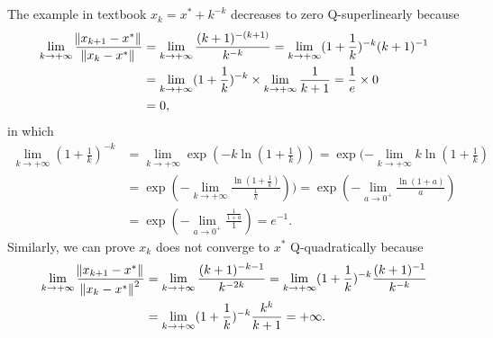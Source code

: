 \documentclass[11pt]{article}
\begin{document}
\maketitle
\section{}
The example in textbook $x_k=x^*+k^{-k}$ decreases to zero Q-superlinearly because \begin{equation}\begin{split}\lim_{k\to+\infty}\frac{\norm{x_{k+1}-x^*}}{\norm{x_{k}-x^*}}&=\lim_{k\to+\infty}\frac{(k+1)^{-(k+1)}}{k^{-k}}=\lim_{k\to+\infty}(1+\frac1k)^{-k}(k+1)^{-1}\\&=\lim_{k\to+\infty}(1+\frac1k)^{-k}\times\lim_{k\to+\infty}\frac1{k+1}=\frac1e\times0\\&=0,\end{split}\nonumber\end{equation} 
in which \begin{equation} \begin{split}\lim_{k\to+\infty} (1+\frac1k)^{-k} &= \lim_{k\to+\infty}\exp(-k\ln(1+\frac1k)) = \exp(-\lim_{k\to+\infty}k\ln(1+\frac1k)\\&=\exp(-\lim_{k\to+\infty} \frac{\ln(1+\frac1k)}{\frac1k}))=\exp(-\lim_{a\to0^+}\frac{\ln(1+a)}a)\\&=\exp(-\lim_{a\to 0^+}\frac{\frac1{1+a}}1)=e^{-1}.\end{split}\nonumber\end{equation} 
Similarly, we can prove ${x_k}$ does not converge to $x^*$ Q-quadratically because \begin{equation}\begin{split}\lim_{k\to+\infty}\frac{\norm{x_{k+1}-x^*}}{\norm{x_{k}-x^*}^2}&=\lim_{k\to+\infty}\frac{(k+1)^{-k-1}}{k^{-2k}}=\lim_{k\to+\infty}(1+\frac1k)^{-k}\frac{(k+1)^{-1}}{k^{-k}}\\&=\lim_{k\to+\infty}(1+\frac1k)^{-k}\frac{k^k}{k+1}=+\infty.\end{split}\nonumber\end{equation}
\end{document}
